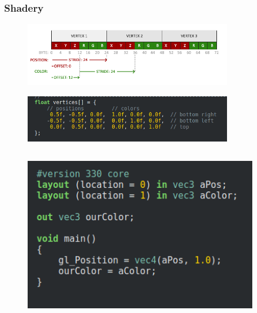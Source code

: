 \documentclass[aspectratio=169]{beamer}
\begin{document}
\begin{frame}[allowframebreaks]
	\frametitle{Shadery}
	\begin{figure}
		\centering
		\includegraphics[width=0.8\textwidth]{vertex_attributes.png}
	\end{figure}
	\framebreak
	
	\begin{figure}
		\centering
		\includegraphics[width=0.8\textwidth]{vertex.png}
	\end{figure}
	\framebreak
	
	\begin{columns}
		\begin{column}{0.5\textwidth}
			\begin{figure}
				\centering
				\includegraphics[width=0.9\textwidth]{vertex_shader.png}
			\end{figure}
		\end{column}	
		

\end{columns}
\end{frame}
\end{document}
